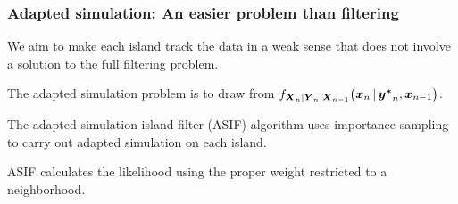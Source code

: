 \documentclass{beamer}
\begin{document}
\begin{frame}
  \frametitle{Adapted simulation: An easier problem than filtering}

  \begin{myitemize}
  \item
    We aim to make each island track the data in a weak sense that does not involve a solution to the full filtering problem.

\vspace{3mm}

  \item
    The adapted simulation problem is to draw from
$f_{\boldsymbol{X}_{n}|\boldsymbol{Y}_{n},\boldsymbol{X}_{n-1}}
  \big(
    \boldsymbol{x}_{n}{\,\vert\,} \boldsymbol{y^*}_{n},\boldsymbol{x}_{n-1}
  \big)$.

\vspace{3mm}

  \item The adapted simulation island filter (ASIF) algorithm uses importance sampling to carry out adapted simulation on each island.


\vspace{3mm}

    \item ASIF calculates the likelihood using the proper weight restricted to a neighborhood.
\end{myitemize}
    
\end{frame}
\end{document}
